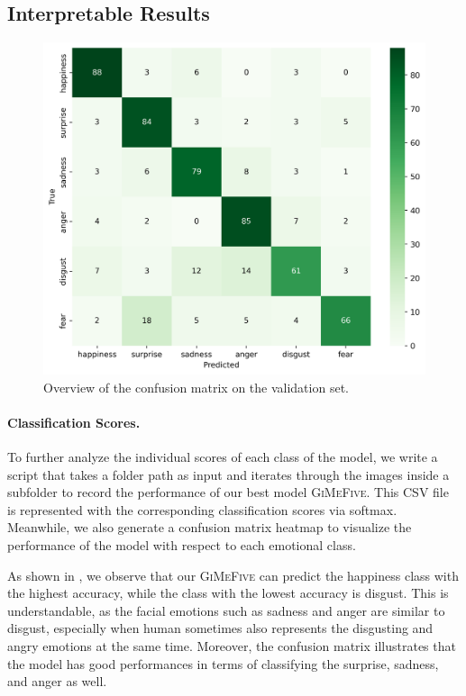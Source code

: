 
\subsection{Interpretable Results}
\label{sec:evaluation:inter}

\begin{figure}[ht]
  \centering
   \includegraphics[width=\linewidth]{matval.png}
   \caption{Overview of the confusion matrix on the validation set.} 
   \label{fig:matval}
\end{figure}

\paragraph{Classification Scores.} 
To further analyze the individual scores of each class of the model, 
we write a script that takes a folder path as input and iterates through the images inside a subfolder to record the performance of our best model \textsc{GiMeFive}. 
This CSV file is represented with the corresponding classification scores via softmax. 
Meanwhile, 
we also generate a confusion matrix heatmap to visualize the performance of the model with respect to each emotional class.

As shown in , 
we observe that our \textsc{GiMeFive} can predict the happiness class with the highest accuracy, 
while the class with the lowest accuracy is disgust. 
This is understandable, 
as the facial emotions such as sadness and anger are similar to disgust, 
especially when human sometimes also represents the disgusting and angry emotions at the same time. 
Moreover, 
the confusion matrix illustrates that the model has good performances in terms of classifying the surprise, sadness, and anger as well. 


